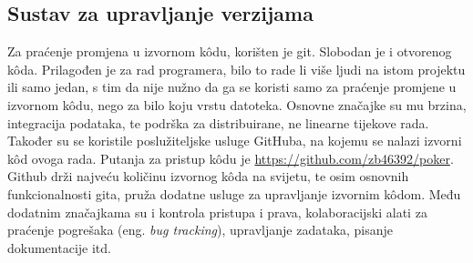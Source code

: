 \subsection{Sustav za upravljanje verzijama}
Za praćenje promjena u izvornom k\^odu, korišten je git. Slobodan je i otvorenog k\^oda. Prilagođen je za rad programera, bilo to rade li više ljudi na istom projektu ili samo jedan, s tim da nije nužno da ga se koristi samo za praćenje promjene u izvornom k\^odu, nego za bilo koju vrstu datoteka. Osnovne značajke su mu brzina, integracija podataka, te podrška za distribuirane, ne linearne tijekove rada. Također su se koristile poslužiteljske usluge GitHuba, na kojemu se nalazi izvorni k\^od ovoga rada. Putanja za pristup k\^odu je \url{https://github.com/zb46392/poker}. Github drži najveću količinu izvornog k\^oda na svijetu, te osim osnovnih funkcionalnosti gita, pruža dodatne usluge za upravljanje izvornim k\^odom. Među dodatnim značajkama su i kontrola pristupa i prava, kolaboracijski alati za praćenje pogrešaka (eng. \textit{bug tracking}), upravljanje zadataka, pisanje dokumentacije itd.

